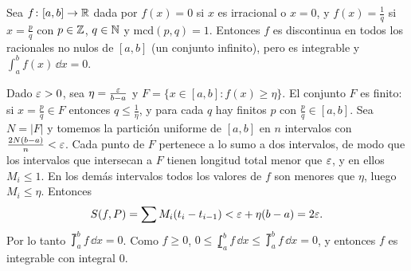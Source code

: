 \begin{eg}
  Sea \(f\colon [a, b] \to \mathbb{R}\) dada por \(f(x) = 0\) si \(x\) es irracional o \(x = 0\), y \(f(x) = \frac{1}{q}\) si \(x = \frac{p}{q}\) con \(p \in \mathbb{Z}\), \(q \in \mathbb{N}\) y \(\mathrm{mcd}(p, q) = 1\). Entonces \(f\) es discontinua en todos los racionales no nulos de \([a, b]\) (un conjunto infinito), pero es integrable y \(\int_a^b f(x) \,\dd x = 0\).

  Dado \(\varepsilon > 0\), sea \(\eta = \frac{\varepsilon}{b - a}\) y \(F = \{ x \in [a, b] : f(x) \geq \eta \}\). El conjunto \(F\) es finito: si \(x = \frac{p}{q} \in F\) entonces \(q \leq \frac{1}{\eta}\), y para cada \(q\) hay finitos \(p\) con \(\frac{p}{q} \in [a, b]\). Sea \(N = |F|\) y tomemos la partición uniforme de \([a, b]\) en \(n\) intervalos con \(\frac{2N (b - a)}{n} < \varepsilon\). Cada punto de \(F\) pertenece a lo sumo a dos intervalos, de modo que los intervalos que intersecan a \(F\) tienen longitud total menor que \(\varepsilon\), y en ellos \(M_i \leq 1\). En los demás intervalos todos los valores de \(f\) son menores que \(\eta\), luego \(M_i \leq \eta\). Entonces
  \[
    S(f, P) = \sum M_i (t_i - t_{i-1}) < \varepsilon + \eta (b - a) = 2\varepsilon.
  \]
  Por lo tanto \(\upint_a^b f \,\dd x = 0\). Como \(f \geq 0\), \(0 \leq \lowint_a^b f \,\dd x \leq \upint_a^b f \,\dd x = 0\), y entonces \(f\) es integrable con integral \(0\).
\end{eg}
